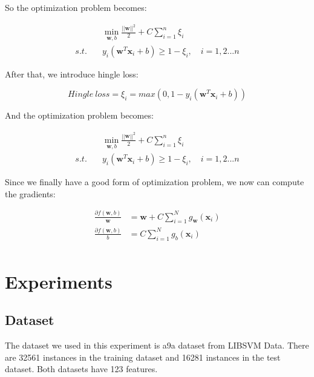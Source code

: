 \documentclass[journal, a4paper]{IEEEtran}
\begin{document}
So the optimization problem becomes:

\begin{equation}
\begin{aligned}
&\min_{\textbf{w},b} \frac{||\textbf{w}||^2}{2} + C \sum_{i=1}^n\xi_i \\
s.t. \quad &y_i(\textbf{w}^T\textbf{x}_i+b)\geq 1- \xi_i, \quad i=1,2...n
\end{aligned}
\end{equation}	

After that, we introduce hingle loss:

\begin{equation}
Hingle~loss = \xi_i = max(0, 1-y_i(\textbf{w}^T\textbf{x}_i+b))
\end{equation}	

And the optimization problem becomes:

\begin{equation}
\begin{aligned}
&\min_{\textbf{w},b} \frac{||\textbf{w}||^2}{2} + C \sum_{i=1}^n\xi_i \\
s.t. \quad &y_i(\textbf{w}^T\textbf{x}_i+b)\geq 1- \xi_i, \quad i=1,2...n
\end{aligned}
\end{equation}	

Since we finally have a good form of optimization problem, we now can compute the gradients:

\begin{equation}
\begin{aligned}
\frac{\partial f(\textbf{w},b)}{\textbf{w}} &= \textbf{w} + C\sum_{i=1}^{N}g_\textbf{w}(\textbf{x}_i) \\
\frac{\partial f(\textbf{w},b)}{b} &= C\sum_{i=1}^{N}g_b(\textbf{x}_i) \\
\end{aligned}
\end{equation}	

\section{Experiments}
\subsection{Dataset}

The dataset we used in this experiment is a9a dataset from LIBSVM Data. There are 32561 instances in the training dataset and 16281 instances in the test dataset. Both datasets have 123 features.
\end{document}
